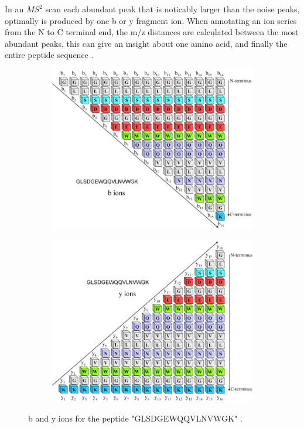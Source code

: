 \documentclass[11pt]{article}
\begin{document}
In an \(MS^2\) scan each abundant peak that is noticably larger than the noise peaks, optimally is produced by one b or y fragment ion. When annotating an ion series from the N to C terminal end, the m/z distances are calculated between the most abundant peaks, this can give an insight about one amino acid, and finally the entire peptide sequence \cite{b-y-ions}.
\begin{figure}
     \centering
     \begin{subfigure}[b]{0.47\textwidth}
         \centering
         \includegraphics[width=\textwidth]{figs/bions.png}
         \caption{}
         \label{fig:b-ions}
     \end{subfigure}
     \hfill
     \begin{subfigure}[b]{0.47\textwidth}
         \centering
         \includegraphics[width=\textwidth]{figs/yions.png}
         \caption{}
         \label{fig:y-ions}
     \end{subfigure}
    \caption{b and y ions for the peptide "GLSDGEWQQVLNVWGK" \cite{b-y-frag}.}
    \label{fig:b-y-ions}
\end{figure}
\end{document}
